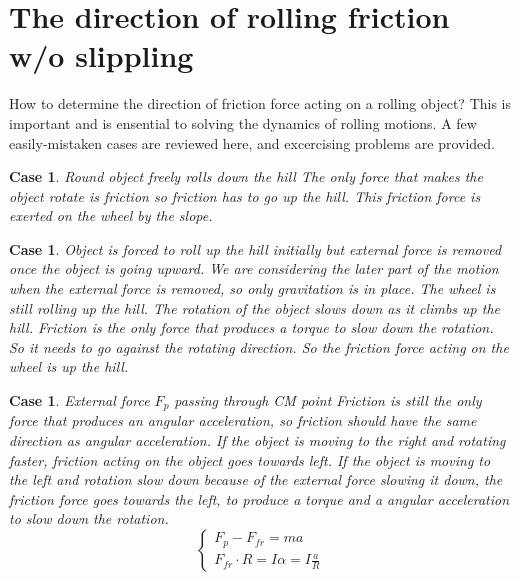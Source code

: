 \documentclass{article}
\newtheorem{case}[theorem]{Case}
\begin{document}
\part{The direction of rolling friction w/o slippling}

How to determine the direction of friction force acting on a rolling object?
This is important and is ensential to solving the dynamics of rolling
motions. A few easily-mistaken cases are reviewed here, and excercising
problems are provided.

\begin{case}
Round object freely rolls down the hill\newline
\newline
The only force that makes the object rotate is friction so friction has to
go up the hill. This friction force is exerted on the wheel by the slope.


\end{case}

\newpage

\begin{case}
Object is forced to roll up the hill initially but external force is removed
once the object is going upward. We are considering the later part of the
motion when the external force is removed, so only gravitation is in place.
The wheel is still rolling up the hill.\newline
\newline
The rotation of the object slows down as it climbs up the hill. Friction is
the only force that produces a torque to slow down the rotation. So it needs
to go against the rotating direction. So the friction force acting on the
wheel is up the hill.


\end{case}

\newpage

\begin{case}
External force $F_{p}$ passing through CM point\newline
\newline
Friction is still the only force that produces an angular acceleration, so
friction should have the same direction as angular acceleration. If the
object is moving to the right and rotating faster, friction acting on the
object goes towards left. If the object is moving to the left and rotation
slow down because of the external force slowing it down, the friction force
goes towards the left, to produce a torque and a angular acceleration to
slow down the rotation.\newline
%
\[
\left\{ 
\begin{array}{c}
F_{p}-F_{fr}=ma \\ 
F_{fr}\cdot R=I\alpha =I\frac{a}{R}%
\end{array}%
\right. 
\]
\end{case}
\end{document}
